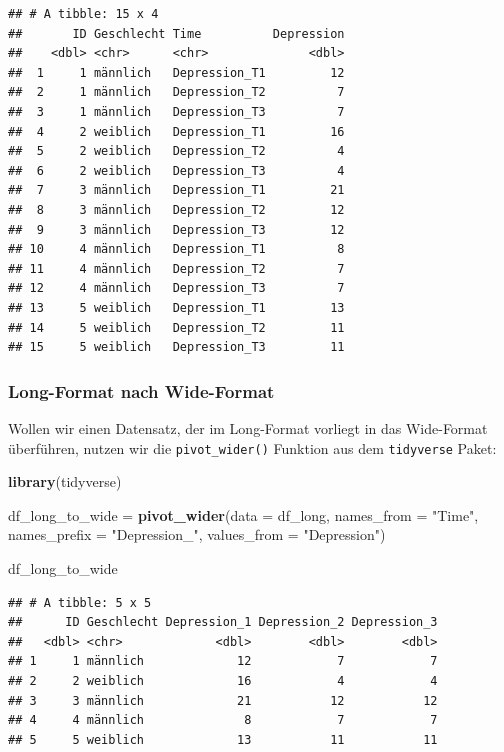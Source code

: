 \documentclass[
]{book}
\newenvironment{Shaded}{\begin{snugshade}}{\end{snugshade}}
\newcommand{\AttributeTok}[1]{\textcolor[rgb]{0.13,0.29,0.53}{#1}}
\newcommand{\FunctionTok}[1]{\textcolor[rgb]{0.13,0.29,0.53}{\textbf{#1}}}
\newcommand{\NormalTok}[1]{#1}
\newcommand{\OtherTok}[1]{\textcolor[rgb]{0.56,0.35,0.01}{#1}}
\newcommand{\StringTok}[1]{\textcolor[rgb]{0.31,0.60,0.02}{#1}}
\begin{document}
\begin{verbatim}
## # A tibble: 15 x 4
##       ID Geschlecht Time          Depression
##    <dbl> <chr>      <chr>              <dbl>
##  1     1 männlich   Depression_T1         12
##  2     1 männlich   Depression_T2          7
##  3     1 männlich   Depression_T3          7
##  4     2 weiblich   Depression_T1         16
##  5     2 weiblich   Depression_T2          4
##  6     2 weiblich   Depression_T3          4
##  7     3 männlich   Depression_T1         21
##  8     3 männlich   Depression_T2         12
##  9     3 männlich   Depression_T3         12
## 10     4 männlich   Depression_T1          8
## 11     4 männlich   Depression_T2          7
## 12     4 männlich   Depression_T3          7
## 13     5 weiblich   Depression_T1         13
## 14     5 weiblich   Depression_T2         11
## 15     5 weiblich   Depression_T3         11
\end{verbatim}

\subsubsection{Long-Format nach Wide-Format}\label{long-format-nach-wide-format}

Wollen wir einen Datensatz, der im Long-Format vorliegt in das Wide-Format überführen, nutzen wir die \texttt{pivot\_wider()} Funktion aus dem \texttt{tidyverse} Paket:

\begin{Shaded}
\begin{Highlighting}[]
\FunctionTok{library}\NormalTok{(tidyverse)}

\NormalTok{df\_long\_to\_wide }\OtherTok{=} \FunctionTok{pivot\_wider}\NormalTok{(}\AttributeTok{data =}\NormalTok{ df\_long, }
                              \AttributeTok{names\_from =} \StringTok{"Time"}\NormalTok{,}
                              \AttributeTok{names\_prefix =} \StringTok{"Depression\_"}\NormalTok{,}
                              \AttributeTok{values\_from =} \StringTok{"Depression"}\NormalTok{)}

\NormalTok{df\_long\_to\_wide}
\end{Highlighting}
\end{Shaded}

\begin{verbatim}
## # A tibble: 5 x 5
##      ID Geschlecht Depression_1 Depression_2 Depression_3
##   <dbl> <chr>             <dbl>        <dbl>        <dbl>
## 1     1 männlich             12            7            7
## 2     2 weiblich             16            4            4
## 3     3 männlich             21           12           12
## 4     4 männlich              8            7            7
## 5     5 weiblich             13           11           11
\end{verbatim}
\end{document}
